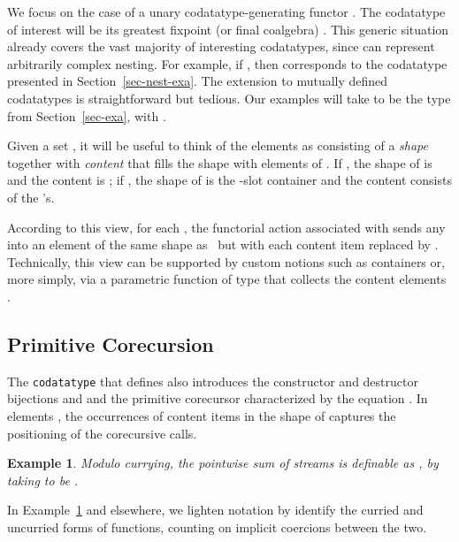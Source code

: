 \documentclass[preprint,draft]
{sigplanconf}
\newcommand{\leftOut}[1]{}
\newcommand\keyw[1]{\texttt{#1}}
\newtheorem{eexample}[theorem]{Example}
\newcommand{\<}{\langle}
\renewcommand{\>}{\rangle}
\begin{document}
\leftOut{
\begin{figure}
\small

\vspace*{-2ex} \caption{An element  of  with content items }
\label{fig-elem}
\end{figure}
}

We focus on the case of a unary codatatype-generating functor .
The codatatype of interest will be its greatest fixpoint
(or final coalgebra)
.
This generic situation
already covers the vast majority of interesting codatatypes, since  can represent arbitrarily complex nesting.
For example,
if , then  corresponds to the  codatatype
presented in Section~\ref{sec-nest-exa}.
The extension to mutually defined codatatypes is straightforward but tedious.
Our examples will take  to be the  type from Section~\ref{sec-exa}, with
.

Given a set ,
it will be useful to think of the elements  as consisting of a {\em shape} together with
{\em content} that fills the shape with elements of .
If , the shape of  is  and the content is ;
if , the shape of  is the -slot
container  and the content consists of the 's.


According to this view,
for each , the functorial action associated with  sends any 
into an element  of the same shape as~ but with each content item  replaced by .
Technically, this view
can be supported by custom notions such as
containers \cite{abbott-et-al-2005} or, more simply, via a parametric function of type  that collects the content elements \cite{traytel-et-al-2012}.



\subsection{Primitive Corecursion}
\label{sec-prim}

The \keyw{codatatype} that defines 
also introduces the constructor and destructor bijections
 and  and the primitive corecursor
 characterized
by the equation .
In elements ,
the occurrences of content items  in the shape of 
captures the positioning of the corecursive calls.

\begin{eexample}\label{exa-prim} \rm
Modulo currying, the pointwise sum of streams  is definable as ,
by taking  to be .
\end{eexample}

In Example~\ref{exa-prim} and elsewhere, we lighten notation by identify
the curried and uncurried forms of functions, counting on implicit coercions
between the two.
\end{document}
